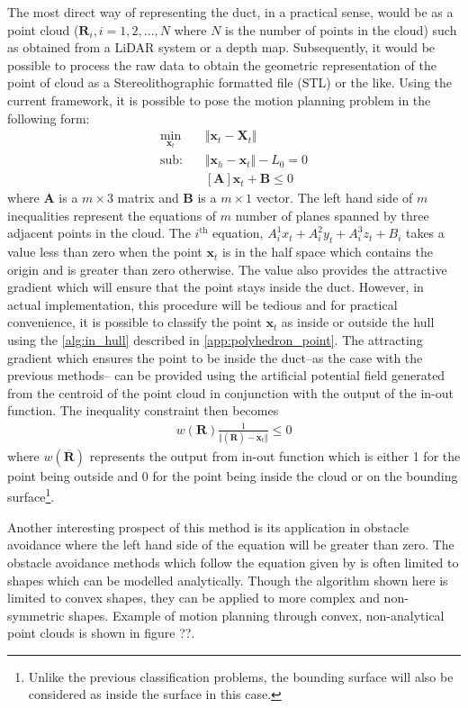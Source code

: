 \documentclass[12pt,a4]{article}
\begin{document}
The most direct way of representing the duct, in a practical sense, would be as a point cloud  ($\mathbf{R}_i,i=1,2,...,N$ where $N$ is the number of points in the cloud) such as obtained from a LiDAR system or a depth map. Subsequently, it would be possible to process the raw data to obtain the geometric representation of the point of cloud as a Stereolithographic formatted file (STL) or the like. Using the current framework, it is possible to pose the motion planning problem in the following form:
\begin{align}
\label{eq:STLeqs}
\min_{\textbf{x}_t} &\Vert \textbf{x}_t-\textbf{X}_t \Vert\\
\nonumber \text{sub:~~~} &\Vert \textbf{x}_h - \textbf{x}_t \Vert -L_0 = 0\\
&[\mathbf{A}]\mathbf{x}_t+\mathbf{B}\leq 0
\end{align}
where $\mathbf{A}$ is a $m\times 3$ matrix and $\mathbf{B}$ is a $m\times 1$ vector. The left hand side of $m$ inequalities represent the equations of $m$ number of planes spanned by three adjacent points in the cloud. The $i^\text{th}$ equation, $A_{i}^1x_t+A_{i}^2y_t+A_{i}^3z_t+B_i$ takes a value less than zero when the point $\mathbf{x}_t$ is in the half space which contains the origin and is greater than zero otherwise. The value also provides the attractive gradient which will ensure that the point stays inside the duct. However, in actual implementation, this procedure will be tedious and for practical convenience, it is possible to classify the point $\mathbf{x}_t$ as inside or outside the hull using the \cref{alg:in_hull} described in \cref{app:polyhedron_point}. The attracting gradient which ensures the point to be inside the duct--as the case with the previous methods-- can be provided using the artificial potential field generated from the centroid of the point cloud in conjunction with the output of the in-out function. The inequality constraint then becomes
\begin{align}
\label{eq:STLineq}
w(\mathbf{R})\frac{1}{\Vert(\overline{\mathbf{R}})-\mathbf{x}_t\Vert}\leq 0
\end{align}
where $w(\overline{\mathbf{R}})$ represents the output from in-out function which is either 1 for the point being outside and 0 for the point being inside the cloud or on the bounding surface\footnote{Unlike the previous classification problems, the bounding surface will also be considered as inside the surface in this case.}. 

Another interesting prospect of this method is its application in obstacle avoidance where the left hand side of the equation  will be greater than zero. The obstacle avoidance methods which follow the equation given by  is often limited to shapes which can be modelled analytically. Though the algorithm shown here is limited to convex shapes, they can be applied to more complex and non-symmetric shapes. Example of motion planning through convex, non-analytical point clouds is shown in figure ??.
\end{document}
